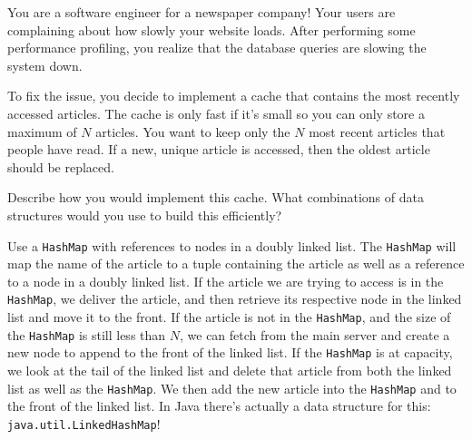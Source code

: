 \question You are a software engineer for a newspaper company! Your users are complaining about how slowly your website loads. After performing some performance profiling, you realize that the database queries are slowing the system down.

To fix the issue, you decide to implement a cache that contains the most recently accessed articles. The cache is only fast if it's small so you can only store a maximum of $N$ articles. You want to keep only the $N$ most recent articles that people have read. If a new, unique article is accessed, then the oldest article should be replaced.

Describe how you would implement this cache. What combinations of data structures would you use to build this efficiently? 

\begin{solution}[2in]
Use a \texttt{HashMap} with references to nodes in a doubly linked list. The \texttt{HashMap} will map the name of the article to a tuple containing the article as well as a reference to a node in a doubly linked list. If the article we are trying to access is in the \texttt{HashMap}, we deliver the article, and then retrieve its respective node in the linked list and move it to the front. If the article is not in the \texttt{HashMap}, and the size of the \texttt{HashMap} is still less than $N$, we can fetch from the main server and create a new node to append to the front of the linked list. If the \texttt{HashMap} is at capacity, we look at the tail of the linked list and delete that article from both the linked list as well as the \texttt{HashMap}. We then add the new article into the \texttt{HashMap} and to the front of the linked list. In Java there's actually a data structure for this: \texttt{java.util.LinkedHashMap}!
\end{solution}